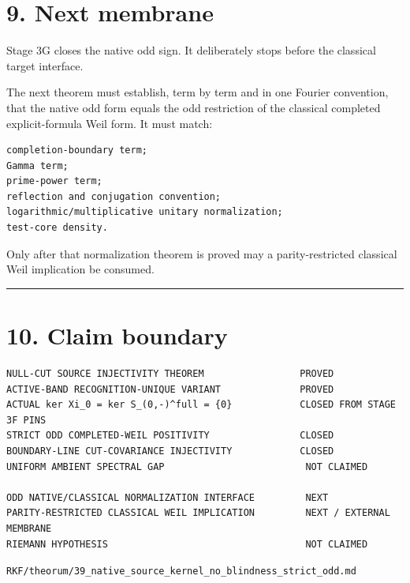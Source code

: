 \hypertarget{next-membrane}{%
\section{9. Next membrane}\label{next-membrane}}

Stage 3G closes the native odd sign. It deliberately stops before the
classical target interface.

The next theorem must establish, term by term and in one Fourier convention,
that the native odd form equals the odd restriction of the classical completed
explicit-formula Weil form. It must match:

\begin{verbatim}
completion-boundary term;
Gamma term;
prime-power term;
reflection and conjugation convention;
logarithmic/multiplicative unitary normalization;
test-core density.
\end{verbatim}

Only after that normalization theorem is proved may a parity-restricted
classical Weil implication be consumed.

\begin{center}\rule{0.5\linewidth}{0.5pt}\end{center}

\hypertarget{claim-boundary}{%
\section{10. Claim boundary}\label{claim-boundary}}

\begin{verbatim}
NULL-CUT SOURCE INJECTIVITY THEOREM                 PROVED
ACTIVE-BAND RECOGNITION-UNIQUE VARIANT              PROVED
ACTUAL ker Xi_0 = ker S_(0,-)^full = {0}            CLOSED FROM STAGE 3F PINS
STRICT ODD COMPLETED-WEIL POSITIVITY                CLOSED
BOUNDARY-LINE CUT-COVARIANCE INJECTIVITY            CLOSED
UNIFORM AMBIENT SPECTRAL GAP                         NOT CLAIMED

ODD NATIVE/CLASSICAL NORMALIZATION INTERFACE         NEXT
PARITY-RESTRICTED CLASSICAL WEIL IMPLICATION         NEXT / EXTERNAL MEMBRANE
RIEMANN HYPOTHESIS                                   NOT CLAIMED
\end{verbatim}

\begin{flushright}\small\texttt{RKF/theorum/39\_native\_source\_kernel\_no\_blindness\_strict\_odd.md}\end{flushright}
